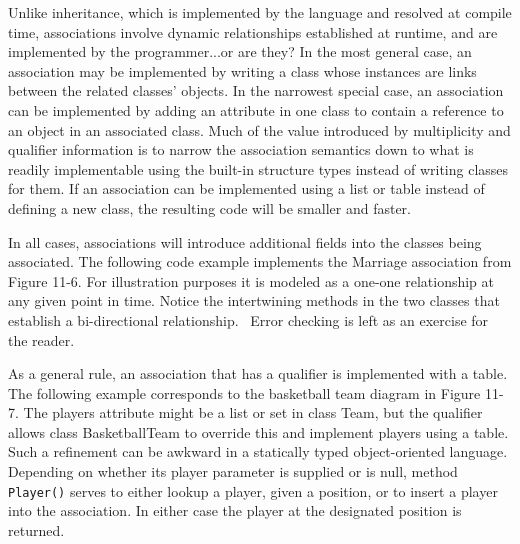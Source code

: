 Unlike inheritance, which is implemented by the language and resolved at
compile time, associations involve dynamic
relationships established at runtime, and are implemented by the
programmer...or are they? In the most general case, an association may
be implemented by writing a class whose instances are links between the
related classes' objects. In the narrowest special
case, an association can be implemented by adding an attribute in one
class to contain a reference to an object in an
associated class. Much of the value introduced by multiplicity and
qualifier information is to narrow the association semantics down to
what is readily implementable using the built-in structure types
instead of writing classes for them. If an association can be
implemented using a list or table instead of defining a new class, the
resulting code will be smaller and faster.

In all cases, associations will introduce additional fields into the
classes being associated. The following code example implements the
Marriage association from Figure 11-6. For illustration purposes it is
modeled as a one-one relationship at any given point in time. Notice
the intertwining methods in the two classes that establish a
bi-directional relationship. \ Error checking is left as an exercise
for the reader.


As a general rule, an association that has a qualifier is implemented
with a table. The following example corresponds to
the basketball team diagram in Figure 11-7. The players attribute might
be a list or set in class Team, but the qualifier allows class
BasketballTeam to override this and implement players using a table.
Such a refinement can be awkward in a statically typed object-oriented
language.
Depending on whether its player parameter is supplied or is null, method
\texttt{Player()} serves to either lookup a player, given a position,
or to insert a player into the association. In either case the player
at the designated position is returned.

